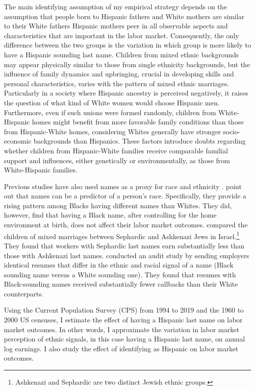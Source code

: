 \documentclass[12pt,english]{article}
\begin{document}
The main identifying assumption of my empirical strategy depends on the assumption that people born to Hispanic fathers and White mothers are similar to their White fathers Hispanic mothers peer in all observable aspects and characteristics that are important in the labor market. Consequently, the only difference between the two groups is the variation in which group is more likely to have a Hispanic sounding last name. Children from mixed ethnic backgrounds may appear physically similar to those from single ethnicity backgrounds, but the influence of family dynamics and upbringing, crucial in developing skills and personal characteristics, varies with the pattern of mixed ethnic marriages. Particularly in a society where Hispanic ancestry is perceived negatively, it raises the question of what kind of White women would choose Hispanic men. Furthermore, even if such unions were formed randomly, children from White-Hispanic homes might benefit from more favorable family conditions than those from Hispanic-White homes, considering Whites generally have stronger socio-economic backgrounds than Hispanics. These factors introduce doubts regarding whether children from Hispanic-White families receive comparable familial support and influences, either genetically or environmentally, as those from White-Hispanic families.

Previous studies have also used names as a proxy for race and ethnicity \autocite{fryer2004causes, rubinstein2014pride, bertrand2004emily}. \textcite{fryer2004causes} point out that names can be a predictor of a person's race. Specifically, they provide a rising pattern among Blacks having different names than Whites. They did, however, find that having a Black name, after controlling for the home environment at birth, does not affect their labor market outcomes. \textcite{rubinstein2014pride} compared the children of mixed marriages between Sephardic and Ashkenazi Jews in Israel.\footnote{Ashkenazi and Sephardic are two distinct Jewish ethnic groups.} They found that workers with Sephardic last names earn substantially less than those with Ashkenazi last names. \textcite{bertrand2004emily} conducted an audit study by sending employers identical resumes that differ in the ethnic and racial signal of a name (Black sounding name versus a White sounding one). They found that resumes with Black-sounding names received substantially fewer callbacks than their White counterparts. 

Using the Current Population Survey (CPS) from 1994 to 2019 and the 1960 to 2000 US censuses, I estimate the effect of having a Hispanic last name on labor market outcomes. In other words, I approximate the variation in labor market perception of ethnic signals, in this case having a Hispanic last name, on annual log earnings. I also study the effect of identifying as Hispanic on labor market outcomes. 
\end{document}
